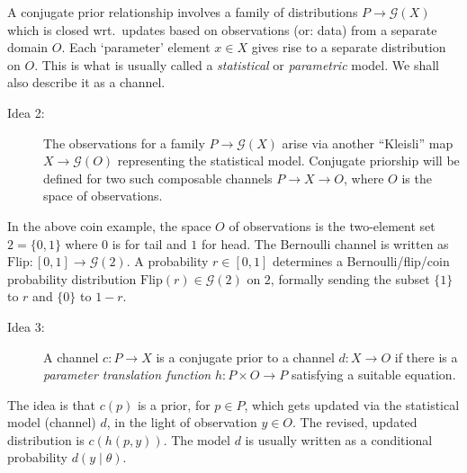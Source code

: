 \documentclass{mscs}
\newcommand{\Giry}{\mathcal{G}}
\newcommand{\R}{\mathbb{R}}
\newcommand{\intd}{{\kern.2em}\mathrm{d}{\kern.03em}}
\newcommand{\flipchan}{\ensuremath{\mathrm{Flip}}}
\begin{document}
A conjugate prior relationship involves a family of distributions $P
\rightarrow \Giry(X)$ which is closed wrt.\ updates based on
observations (or: data) from a separate domain $O$. Each `parameter'
element $x\in X$ gives rise to a separate distribution on $O$. This is
what is usually called a \emph{statistical} or \emph{parametric}
model. We shall also describe it as a channel.


\begin{description}
\item[Idea 2:] The observations for a family $P \rightarrow \Giry(X)$
  arise via another ``Kleisli'' map $X \rightarrow \Giry(O)$
  representing the statistical model. Conjugate priorship will be
  defined for two such composable channels $P \rightarrow X
  \rightarrow O$, where $O$ is the space of observations.
\end{description}


In the above coin example, the space $O$ of observations is the
two-element set $2 = \{0,1\}$ where $0$ is for tail and $1$ for head.
The Bernoulli channel is written as $\flipchan \colon [0,1]
\rightarrow \Giry(2)$.  A probability $r\in [0,1]$ determines a
Bernoulli/flip/coin probability distribution $\flipchan(r) \in
\Giry(2)$ on $2$, formally sending the subset $\{1\}$ to $r$ and
$\{0\}$ to $1-r$.

\begin{description}
\item[Idea 3:] A channel $c\colon P\rightarrow X$ is a conjugate prior
  to a channel $d\colon X \rightarrow O$ if there is a \emph{parameter
    translation function} $h\colon P\times O \rightarrow P$ satisfying
  a suitable equation.
\end{description}

\noindent The idea is that $c(p)$ is a prior, for $p\in P$, which gets
updated via the statistical model (channel) $d$, in the light of
observation $y\in O$. The revised, updated distribution is
$c(h(p,y))$. The model $d$ is usually written as a conditional
probability $d(y\mid \theta)$.
\end{document}
